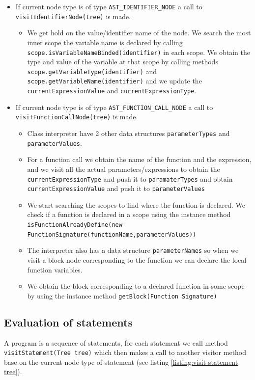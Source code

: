 \begin{itemize}
	\item If current node type is of type \verb!AST_IDENTIFIER_NODE! a call to \verb!visitIdentifierNode(tree)! is made.
	      \begin{itemize}
	      	\item We get hold on the value/identifier name of the node. We search  the most inner scope the variable name is declared by calling \verb!scope.isVariableNameBinded(identifier)! in each scope. We obtain the type  and value of the variable at that scope by calling methods \verb!scope.getVariableType(identifier)! and \verb!scope.getVariableName(identifier)! and we update the \verb!currentExpressionValue! and \verb!currentExpressionType!.
	      \end{itemize}
	\item If current node type is of type \verb!AST_FUNCTION_CALL_NODE! a call to \verb!visitFunctionCallNode(tree)! is made.
	      \begin{itemize}
	      	\item Class interpreter have 2 other data structures \verb!parameterTypes! and \verb!parameterValues!.
	      	\item For a function call we obtain the name of the function and the expression, and we visit all the actual parameters/expressions to obtain the \verb!currentExpressionType! and push it to \verb!paramaterTypes! and obtain \verb!currentExpressionValue! and push it to \verb!parameterValues! 
	      	\item We start searching the scopes to find where the function is declared. We check if a function is declared in a scope using the instance method \verb!isFunctionAlreadyDefine(new FunctionSignature(functionName,parameterValues))!
	      	\item  The interpreter also has a data structure \verb!parameterNames! so when we visit a block node corresponding to the function we can declare the local function variables.
	      	\item We obtain the block corresponding to a declared function in some scope by using the instance method \verb!getBlock(Function Signature)!
	      \end{itemize}
	      	      	               
\end{itemize}

\subsection{Evaluation of statements}
A program is a sequence of statements, for each statement we call method \verb!visitStatement(Tree tree)! which
then makes a call to another visitor method base on the current node
type of statement (see listing \ref{listing:visit statement tree}).


